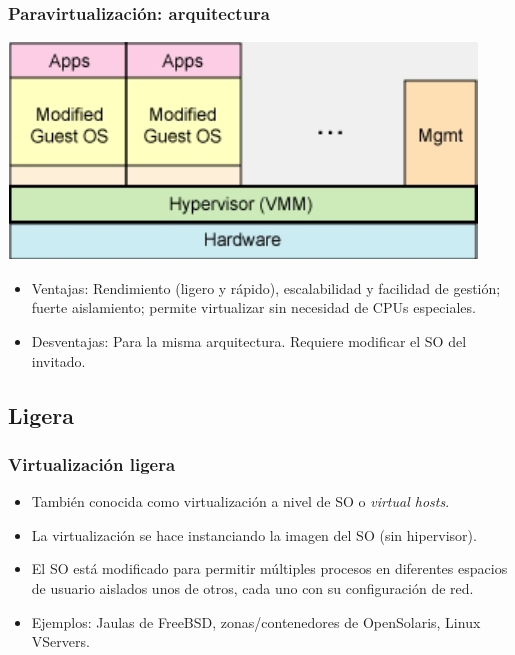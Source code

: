 \documentclass{beamer}
\begin{document}
\begin{frame}
\frametitle{Paravirtualización: arquitectura}
\begin{center}
\includegraphics[scale=0.35,clip=false]{figs/paravirt.png}
\end{center}

\begin{itemize}
\item \alert{Ventajas:} Rendimiento (ligero y rápido), escalabilidad y facilidad de gestión; fuerte aislamiento; permite virtualizar sin necesidad de CPUs especiales. 
\item \alert{Desventajas:} Para la misma arquitectura. Requiere modificar el SO del invitado.
\end{itemize}


\end{frame}




\subsection{Ligera}

\begin{frame}
\frametitle{Virtualización ligera}

\begin{itemize}
\item También conocida como \alert{virtualización a nivel de SO} o \textit{virtual hosts}.
\item La virtualización se hace instanciando la imagen del SO (sin hipervisor).
\item El SO está modificado para permitir múltiples procesos en diferentes espacios de usuario aislados unos de otros, cada uno con su configuración de red.
\item \alert{Ejemplos:} Jaulas de FreeBSD, zonas/contenedores de OpenSolaris, Linux VServers. 
\end{itemize}

\end{frame}
\end{document}
